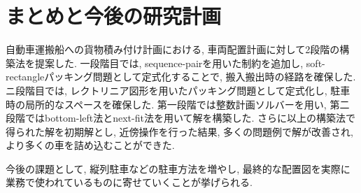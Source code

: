 \chapter{まとめと今後の研究計画}\label{conclution}
自動車運搬船への貨物積み付け計画における, 車両配置計画に対して2段階の構築法を提案した. 
一段階目では, sequence-pairを用いた制約を追加し, soft-rectangleパッキング問題として定式化することで, 搬入搬出時の経路を確保した.  
ニ段階目では, レクトリニア図形を用いたパッキング問題として定式化し, 駐車時の局所的なスペースを確保した. 
第一段階では整数計画ソルバーを用い, 第二段階ではbottom-left法とnext-fit法を用いて解を構築した. 
さらに以上の構築法で得られた解を初期解とし, 近傍操作を行った結果, 多くの問題例で解が改善され, より多くの車を詰め込むことができた. 

今後の課題として, 縦列駐車などの駐車方法を増やし, 最終的な配置図を実際に業務で使われているものに寄せていくことが挙げられる. 
